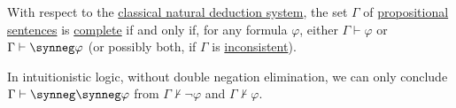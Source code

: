 \begin{proposition}\label{thm:propositional_syntactically_complete_set}
  With respect to the \hyperref[def:propositional_natural_deduction]{classical natural deduction system}, the set \( \Gamma \) of \hyperref[def:propositional_formula]{propositional sentences} is \hyperref[def:complete_set_of_sentences]{complete} if and only if, for any formula \( \varphi \), either \( \Gamma \vdash \varphi \) or \( \Gamma \vdash \synneg \varphi \) (or possibly both, if \( \Gamma \) is \hyperref[def:propositional_theory/consistent]{inconsistent}).
\end{proposition}
\begin{comments}
  \item In intuitionistic logic, without double negation elimination, we can only conclude \( \Gamma \vdash \synneg \synneg \varphi \) from \( \Gamma \nvdash \neg \varphi \) and \( \Gamma \nvdash \varphi \).
\end{comments}
